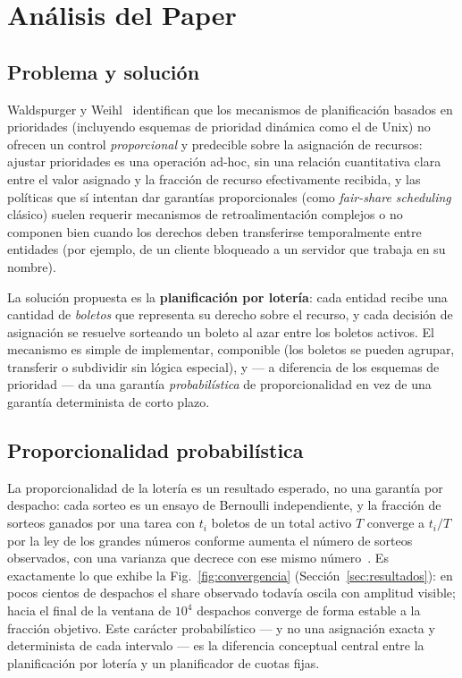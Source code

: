 \section{Análisis del Paper}
\label{sec:analisis-extension}

\subsection{Problema y solución}

Waldspurger y Weihl~\cite{Waldspurger1994} identifican que los mecanismos de
planificación basados en prioridades (incluyendo esquemas de prioridad
dinámica como el de Unix) no ofrecen un control \emph{proporcional} y
predecible sobre la asignación de recursos: ajustar prioridades es una
operación ad-hoc, sin una relación cuantitativa clara entre el valor
asignado y la fracción de recurso efectivamente recibida, y las políticas
que sí intentan dar garantías proporcionales (como \textit{fair-share
scheduling} clásico) suelen requerir mecanismos de retroalimentación
complejos o no componen bien cuando los derechos deben transferirse
temporalmente entre entidades (por ejemplo, de un cliente bloqueado a un
servidor que trabaja en su nombre).

La solución propuesta es la \textbf{planificación por lotería}: cada
entidad recibe una cantidad de \textit{boletos} que representa su derecho
sobre el recurso, y cada decisión de asignación se resuelve sorteando un
boleto al azar entre los boletos activos. El mecanismo es simple de
implementar, componible (los boletos se pueden agrupar, transferir o
subdividir sin lógica especial), y --- a diferencia de los esquemas de
prioridad --- da una garantía \emph{probabilística} de proporcionalidad en
vez de una garantía determinista de corto plazo.

\subsection{Proporcionalidad probabilística}

La proporcionalidad de la lotería es un resultado esperado, no una garantía
por despacho: cada sorteo es un ensayo de Bernoulli independiente, y la
fracción de sorteos ganados por una tarea con $t_i$ boletos de un total
activo $T$ converge a $t_i/T$ por la ley de los grandes números conforme
aumenta el número de sorteos observados, con una varianza que decrece con
ese mismo número~\cite{NIST2003Handbook, Illowsky2024}. Es exactamente lo
que exhibe la Fig.~\ref{fig:convergencia}
(Sección~\ref{sec:resultados}): en pocos cientos de despachos el share
observado todavía oscila con amplitud visible; hacia el final de la ventana
de $10^4$ despachos converge de forma estable a la fracción objetivo. Este
carácter probabilístico --- y no una asignación exacta y determinista de
cada intervalo --- es la diferencia conceptual central entre la
planificación por lotería y un planificador de cuotas fijas.

